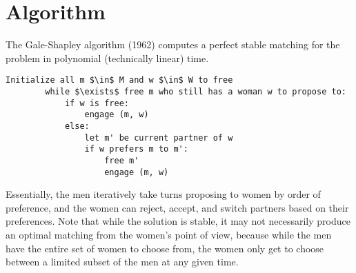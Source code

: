 \documentclass[11pt]{article}
\begin{document}
\section{Algorithm}
	The Gale-Shapley algorithm (1962) computes a perfect stable matching for the problem in polynomial (technically linear) time.
	
	\begin{lstlisting}[autogobble=true,mathescape]
		Initialize all m $\in$ M and w $\in$ W to free
		while $\exists$ free m who still has a woman w to propose to:
			if w is free:
				engage (m, w)
			else:
				let m' be current partner of w
				if w prefers m to m':
					free m'
					engage (m, w)
	\end{lstlisting}
	
	 Essentially, the men iteratively take turns proposing to women by order of preference, and the women can reject, accept, and switch partners based on their preferences. Note that while the solution is stable, it may not necessarily produce an optimal matching from the women's point of view, because while the men have the entire set of women to choose from, the women only get to choose between a limited subset of the men at any given time.

%		
%		


\end{document}
